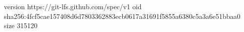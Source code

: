 version https://git-lfs.github.com/spec/v1
oid sha256:4fcf5cae157408d6d7803362883ecb0617a31691f5855a6380c5a3a6e51bbaa0
size 315120
